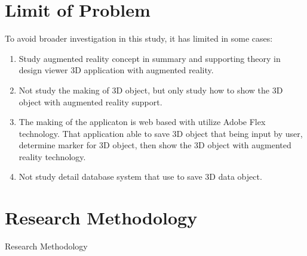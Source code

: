 \documentclass[12pt,a4paper,pdftex,final,oneside,titlepage]{book}
\begin{document}
\section{Limit of Problem} %
\label{batasan}
To avoid broader investigation in this study, it has limited in some cases:\\
\begin{enumerate}
\item Study augmented reality concept in summary and supporting theory in design viewer 3D application with augmented reality.
\item Not study the making of 3D object, but only study how to show the 3D object with augmented reality support.
\item The making of the applicaton is web based with utilize Adobe Flex technology. That application able to save 3D object that being input by user, determine marker for 3D object, then show the 3D object with augmented reality technology.
\item Not study detail database system that use to save 3D data object.
\end{enumerate}

\section{Research Methodology}
\label{sec:metodologi_penelitian}
Research Methodology
\end{document}

